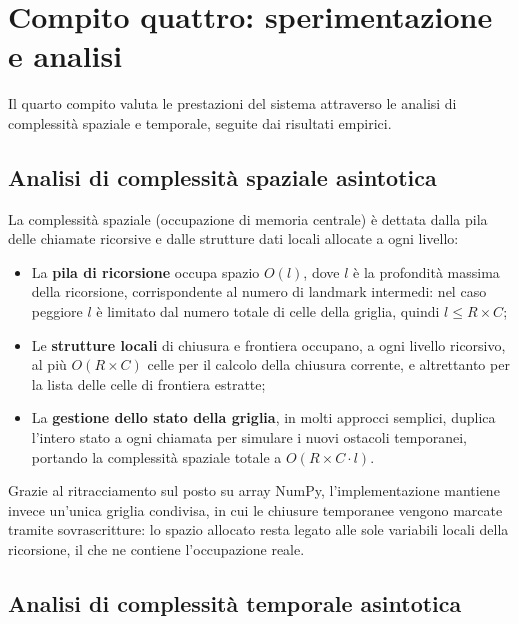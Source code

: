 \section{Compito quattro: sperimentazione e analisi}

Il quarto compito valuta le prestazioni del sistema attraverso le analisi di complessità spaziale e temporale, seguite dai risultati empirici.

\subsection{Analisi di complessità spaziale asintotica}
\label{sec:complessita_spaziale}

La complessità spaziale (occupazione di memoria centrale) è dettata dalla pila delle chiamate ricorsive e dalle strutture dati locali allocate a ogni livello:
\begin{itemize}
    \item La \textbf{pila di ricorsione} occupa spazio $O(l)$, dove $l$ è la profondità massima della ricorsione, corrispondente al numero di landmark intermedi: nel caso peggiore $l$ è limitato dal numero totale di celle della griglia, quindi $l \le R \times C$;
    \item Le \textbf{strutture locali} di chiusura e frontiera occupano, a ogni livello ricorsivo, al più $O(R \times C)$ celle per il calcolo della chiusura corrente, e altrettanto per la lista delle celle di frontiera estratte;
    \item La \textbf{gestione dello stato della griglia}, in molti approcci semplici, duplica l'intero stato a ogni chiamata per simulare i nuovi ostacoli temporanei, portando la complessità spaziale totale a $O(R \times C \cdot l)$.
\end{itemize}

Grazie al ritracciamento sul posto su array NumPy, l'implementazione mantiene invece un'unica griglia condivisa, in cui le chiusure temporanee vengono marcate tramite sovrascritture: lo spazio allocato resta legato alle sole variabili locali della ricorsione, il che ne contiene l'occupazione reale.

\subsection{Analisi di complessità temporale asintotica}
\label{sec:complessita_temporale}

